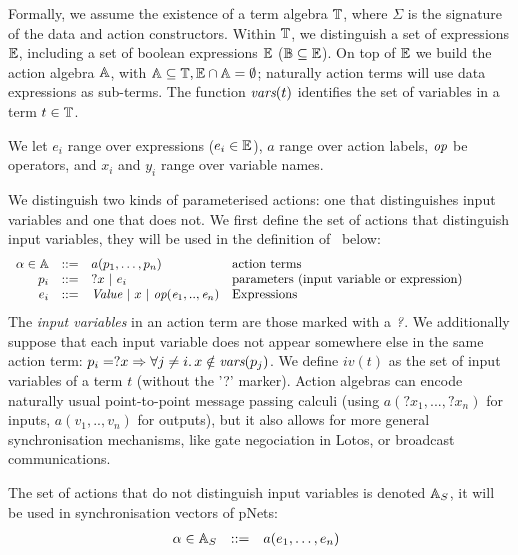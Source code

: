 \documentclass{lmcs}
\newcommand{\TODO}[1]{\textcolor{red}{\textbf{[TODO:#1]}}}
\begin{document}

Formally, we assume the existence of a term algebra $\mathbb{T}$,
where $\Sigma$ is the signature of the data and action constructors. Within $\mathbb{T}$, we distinguish a set of
 expressions $\mathbb{E}$, including a set of boolean
expressions $\mathbb{E}$ ($\mathbb{B}\subseteq\mathbb{E}$). 
On top of $\mathbb{E}$ we build the action algebra
$\mathbb{A}$, with $\mathbb{A}\subseteq\mathbb{T},
\mathbb{E}\cap\mathbb{A}=\emptyset$;
naturally action terms will use data expressions as sub-terms.
The function
$\vars(t)$ identifies the set of variables in a term
$t\in\mathbb{T}$.

We let $e_i$ range over expressions ($e_i\in\mathbb{E}$), $a$
range over action labels, $\symb{op}$ be operators, and $x_i$ and $y_i$ range over
variable names. 

We distinguish two kinds of parameterised actions: one that distinguishes input variables and one that does not. 
We first define the set of actions that distinguish input variables, they will be used in the definition of \pLTS\ below:
\[
\begin{array}[l]{rcl@{\quad}p{7.5cm}}
  \alpha\in\AlgA&::=&a(p_1,\ldots,p_n)&\text{action terms}\\
  p_i&::=& ?x~|~e_i&\text{parameters (input variable or expression)}\\
  e_i&::=& \symb{Value}~|~x~|~\symb{op}(\symb{e}_1,..,\symb{e}_n)&\text{Expressions}
\end{array}
\]
The \emph{input variables} in an action term are those marked with a
$\symb{?}$.
We additionally suppose that each input variable does not
appear somewhere else in the same action term:
$p_i=?x\Rightarrow\forall j\neq i.\, x\notin \vars(p_j)$.
We define $iv(t)$  as the set of input variables of a term $t$ (without the '?' marker).
Action algebras can encode naturally usual point-to-point message passing calculi (using 
$a(?x_1,...,?x_n)$ for inputs, $a(v_1,..,v_n)$ for outputs), but it also allows
for more general synchronisation mechanisms, like gate negociation in Lotos, or broadcast
communications. 

The set of actions that do not distinguish input variables is denoted $\mathbb{A}_S$, it will be used in synchronisation vectors of pNets:
\[\begin{array}[l]{rcl@{\quad}l}
  \alpha\in \AlgAS &::=&a(e_1,\ldots,e_n)
\end{array}
\]
\end{document}
